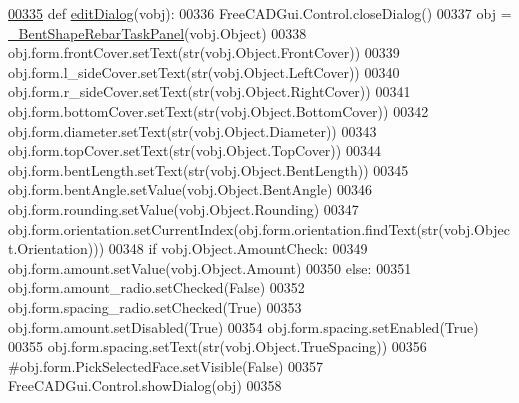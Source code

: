 \begin{DoxyCode}
\hypertarget{namespaceBentShapeRebar.tex_l00335}{}\hyperlink{namespaceBentShapeRebar_ae5db82a49148a0a8f6fa567fa72d93b2}{00335} \textcolor{keyword}{def }\hyperlink{namespaceBentShapeRebar_ae5db82a49148a0a8f6fa567fa72d93b2}{editDialog}(vobj):
00336     FreeCADGui.Control.closeDialog()
00337     obj = \hyperlink{classBentShapeRebar_1_1__BentShapeRebarTaskPanel}{\_BentShapeRebarTaskPanel}(vobj.Object)
00338     obj.form.frontCover.setText(str(vobj.Object.FrontCover))
00339     obj.form.l\_sideCover.setText(str(vobj.Object.LeftCover))
00340     obj.form.r\_sideCover.setText(str(vobj.Object.RightCover))
00341     obj.form.bottomCover.setText(str(vobj.Object.BottomCover))
00342     obj.form.diameter.setText(str(vobj.Object.Diameter))
00343     obj.form.topCover.setText(str(vobj.Object.TopCover))
00344     obj.form.bentLength.setText(str(vobj.Object.BentLength))
00345     obj.form.bentAngle.setValue(vobj.Object.BentAngle)
00346     obj.form.rounding.setValue(vobj.Object.Rounding)
00347     obj.form.orientation.setCurrentIndex(obj.form.orientation.findText(str(vobj.Object.Orientation)))
00348     \textcolor{keywordflow}{if} vobj.Object.AmountCheck:
00349         obj.form.amount.setValue(vobj.Object.Amount)
00350     \textcolor{keywordflow}{else}:
00351         obj.form.amount\_radio.setChecked(\textcolor{keyword}{False})
00352         obj.form.spacing\_radio.setChecked(\textcolor{keyword}{True})
00353         obj.form.amount.setDisabled(\textcolor{keyword}{True})
00354         obj.form.spacing.setEnabled(\textcolor{keyword}{True})
00355         obj.form.spacing.setText(str(vobj.Object.TrueSpacing))
00356     \textcolor{comment}{#obj.form.PickSelectedFace.setVisible(False)}
00357     FreeCADGui.Control.showDialog(obj)
00358 
\end{DoxyCode}
